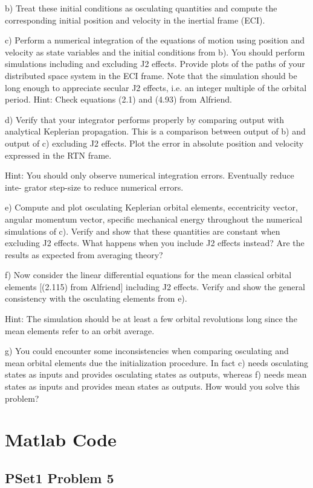 \documentclass[12pt,a4paper,notitlepage]{article}
\begin{document}
b) Treat these initial conditions as osculating quantities and compute the corresponding
initial position and velocity in the inertial frame (ECI).

c) Perform a numerical integration of the equations of motion using position and velocity
as state variables and the initial conditions from b). You should perform simulations
including and excluding J2 effects. Provide plots of the paths of your distributed space
system in the ECI frame. Note that the simulation should be long enough to appreciate
secular J2 effects, i.e. an integer multiple of the orbital period.
Hint: Check equations (2.1) and (4.93) from Alfriend.

d) Verify that your integrator performs properly by comparing output with analytical
Keplerian propagation. This is a comparison between output of b) and output of c)
excluding J2 effects. Plot the error in absolute position and velocity expressed in the
RTN frame.

Hint: You should only observe numerical integration errors. Eventually reduce inte-
grator step-size to reduce numerical errors.

e) Compute and plot osculating Keplerian orbital elements, eccentricity vector, angular
momentum vector, specific mechanical energy throughout the numerical simulations
of c). Verify and show that these quantities are constant when excluding J2 effects.
What happens when you include J2 effects instead? Are the results as expected from
averaging theory?

f) Now consider the linear differential equations for the mean classical orbital elements
[(2.115) from Alfriend] including J2 effects. Verify and show the general consistency
with the osculating elements from e).

Hint: The simulation should be at least a few orbital revolutions long since the mean
elements refer to an orbit average.

g) You could encounter some inconsistencies when comparing osculating and mean orbital
elements due the initialization procedure. In fact c) needs osculating states as inputs
and provides osculating states as outputs, whereas f) needs mean states as inputs and
provides mean states as outputs. How would you solve this problem?
\newpage
\printbibliography

\newpage
\appendix
\addappheadtotoc
\Large{\bf{\appendixname}}
\section{Matlab Code}
\subsection{PSet1 Problem 5}\label{A:P1p5}


\end{document}

